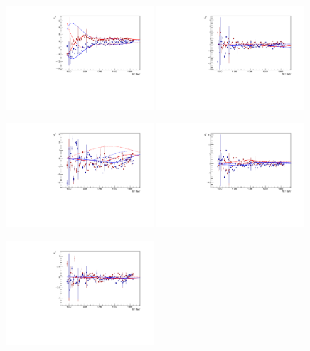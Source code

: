 \documentclass[a4paper,12pt]{report}
\begin{document}
\begin{figure}
  \begin{center}
    \centerline{
    \includegraphics[width=0.49\textwidth]{BnGa/free/plots.0/E0p.pdf}
    \includegraphics[width=0.49\textwidth]{BnGa/free/plots.0/E1p.pdf}
    }
    \centerline{
    \includegraphics[width=0.49\textwidth]{BnGa/free/plots.0/M1p.pdf}
    \includegraphics[width=0.49\textwidth]{BnGa/free/plots.0/M1m.pdf}
    }
    \centerline{
    \includegraphics[width=0.49\textwidth]{BnGa/free/plots.0/E2p.pdf}
}
\end{center}
\end{figure}
\end{document}
